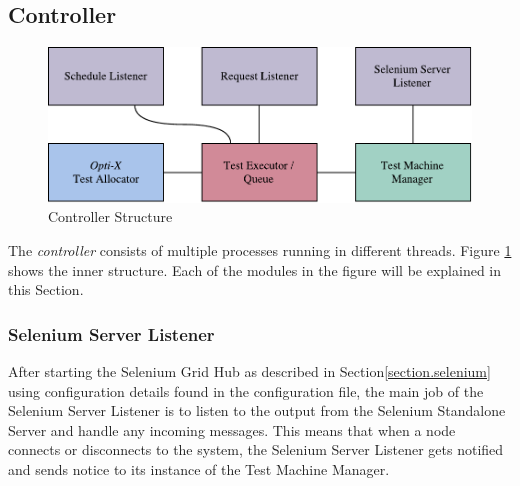 




\subsection{Controller}

\begin{figure}[h]
    \centering
    \includegraphics[width=\textwidth]{figures/new/controller.pdf}
    \caption{Controller Structure}
    \label{fig.controller_structure}
\end{figure}


The \emph{controller} consists of multiple processes running in different threads. Figure \ref{fig.controller_structure} shows the inner structure. Each of the modules in the figure will be explained in this Section.

\subsubsection{Selenium Server Listener}
After starting the Selenium Grid Hub as described in Section\ref{section.selenium} using configuration details found in the configuration file, the main job of the Selenium Server Listener is to listen to the output from the Selenium Standalone Server and handle any incoming messages. This means that when a node connects or disconnects to the system, the Selenium Server Listener gets notified and sends notice to its instance of the Test Machine Manager.

